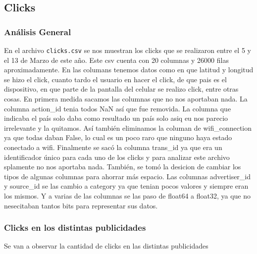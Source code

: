 \documentclass[a4paper, 12pt]{article}
\newcommand\tab[1][1cm]{\hspace*{#1}}
\begin{document}
\clearpage
\subsection{Clicks}
	\subsubsection{Análisis General}
		\tab En el archivo \texttt{clicks.csv} se nos muestran los clicks que se realizaron entre el 5 y el 13 de Marzo de este año. Este csv cuenta con 20 columnas y 26000 filas aproximadamente. En las columans tenemos datos como en que latitud y longitud se hizo el click, cuanto tardo el usuario en hacer el click, de que pais es el dispositivo, en que parte de la pantalla del celular se realizo click, entre otras cosas.
		\tab En primera medida sacamos las columnas que no nos aportaban nada. La columna action_id tenia todos NaN así que fue removida. La columna que indicaba el país solo daba como resultado un país solo asiq eu nos parecio irrelevante y la quitamos. Así también eliminamos la columan de wifi_connection ya que todas daban False, lo cual es un poco raro que ninguno haya estado conectado a wifi. Finalmente se sacó la columna trans_id ya que era un identificador único para cada uno de los clicks y para analizar este archivo splamente no nos aportaba nada.
		\tab También, se tomó la desicion de cambiar los tipos de algunas columnas para ahorrar más espacio. Las columnas advertiser_id y source_id se las cambio a category ya que tenian pocos valores y siempre eran los mismos. Y a varias de las columnas se las paso de float64 a float32, ya que no nesecitaban tantos bits para representar sus datos.

	\subsubsection{Clicks en los distintas publicidades}
		\tab Se van a observar la cantidad de clicks en las distintas publicidades
\end{document}
